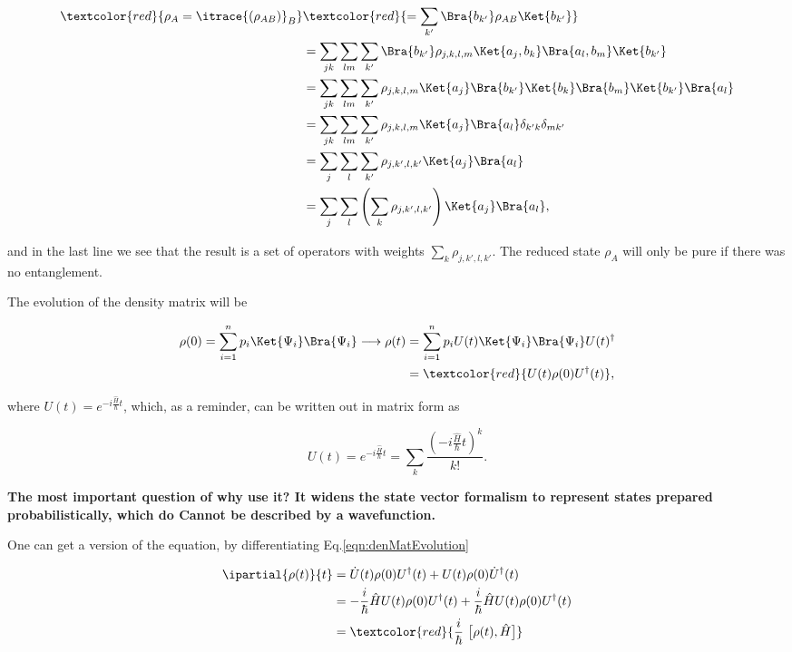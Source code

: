 \begin{equation}
  \begin{aligned}
    \textcolor{red}{\rho_A = \itrace{(\rho_{AB})}_B} &  \textcolor{red}{= \sum_{k'} \Bra{b_{k'}}\rho_{AB}\Ket{b_{k'}}}\\
    & = \sum_{jk}\sum_{lm}\sum_{k'} \Bra{b_{k'}}\rho_{j,k,l,m}\Ket{a_j,b_k}\Bra{a_l,b_m}\Ket{b_{k'}}\\
    & = \sum_{jk}\sum_{lm}\sum_{k'} \rho_{j,k,l,m}\Ket{a_j}\Bra{b_{k'}}\Ket{b_k}\Bra{b_m}\Ket{b_{k'}}\Bra{a_l}\\
    & = \sum_{jk}\sum_{lm}\sum_{k'} \rho_{j,k,l,m}\Ket{a_j}\Bra{a_l}\delta_{k'k}\delta_{mk'}\\
    & = \sum_{j}\sum_{l}\sum_{k'} \rho_{j,k',l,k'}\Ket{a_j}\Bra{a_l}\\
    &    =     \sum_{j}\sum_{l}\left(    \sum_{k}\rho_{j,k',l,k'}\right)
    \Ket{a_j}\Bra{a_l},
  \end{aligned}
\end{equation}

\noindent  and in  the last  line we  see that  the result  is a  set of
operators  with weights  $\sum_{k}\rho_{j,k',l,k'}$.  The  reduced state
$\rho_A$ will only be pure if there was no entanglement.

The evolution of the density matrix will be

\begin{equation}
  \label{eqn:denMatEvolution}
  \begin{aligned}
    \rho(0) = \sum_{i=1}^{n} p_i\Ket{\Psi_i}\Bra{\Psi_i} \longrightarrow \rho(t) & = \sum_{i=1}^{n} p_iU(t)\Ket{\Psi_i}\Bra{\Psi_i}U(t)^{\dagger}\\
    & = \textcolor{red}{U(t)\rho(0)U^\dagger(t)},
  \end{aligned}
\end{equation}

\noindent where $U(t) = e^{-i\frac{\hat{H}}{\hbar}t}$, which, as a reminder,
can be written out in matrix form as

\begin{equation}
  U(t) = e^{-i\frac{\hat{H}}{\hbar}t} = \sum_k \frac{\left( -i\frac{\hat{H}}{\hbar}t\right)^k }{k!}.
\end{equation}

\textbf{The most important  question of why use it? It  widens the state
  vector formalism to represent states prepared probabilistically, which
  do {\LARGE Cannot be described by a wavefunction.}}

One can get  a version of the \schrodinger  equation, by differentiating
Eq.\eqref{eqn:denMatEvolution}

\begin{equation}
  \label{eqn:vonNeuman}
  \begin{aligned}
    \ipartial{\rho(t)}{t} & = \dot{U}(t)\rho(0)U^\dagger(t) + {U}(t)\rho(0)\dot{U}^\dagger(t)\\
    & = -\frac{i}{\hbar}\hat{H}{U}(t)\rho(0)U^\dagger(t) + \frac{i}{\hbar}\hat{H}{U}(t)\rho(0){U}^\dagger(t)\\
    & = \textcolor{red}{\frac{i}{\hbar}\ \big[\rho(t),\hat{H}\big]}
  \end{aligned}
\end{equation}
\newpage
